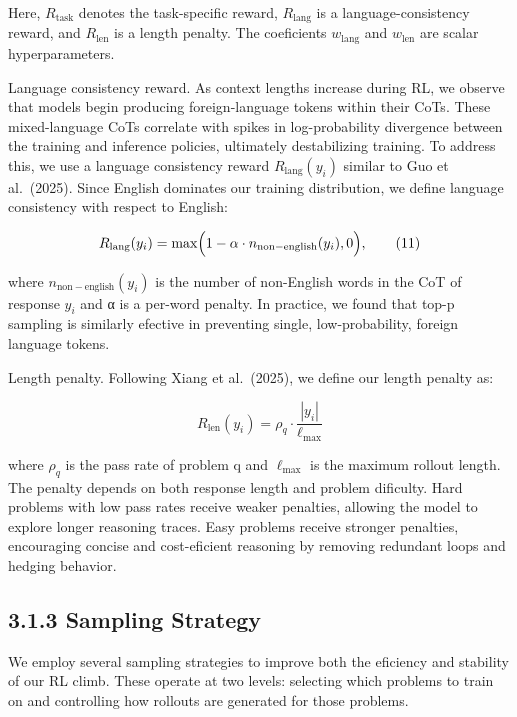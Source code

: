 \documentclass[
  10
]{article}
\begin{document}
Here, \(R _ { \mathrm { t a s k } }\) denotes the task-specific reward,
\(R _ { \mathrm { l a n g } }\) is a language-consistency reward, and
\(R _ { \mathrm { l e n } }\) is a length penalty. The coeficients
\(w _ { \mathrm { l a n g } }\) and \(w _ { \mathrm { l e n } }\) are
scalar hyperparameters.

Language consistency reward. As context lengths increase during RL, we
observe that models begin producing foreign-language tokens within their
CoTs. These mixed-language CoTs correlate with spikes in log-probability
divergence between the training and inference policies, ultimately
destabilizing training. To address this, we use a language consistency
reward \(R _ { \mathrm { l a n g } } ( y _ { i } )\) similar to Guo et
al.~(2025). Since English dominates our training distribution, we define
language consistency with respect to English:

\[
R _ { \mathrm { l a n g } } ( y _ { i } ) = \operatorname* { m a x } \Bigl ( 1 - \alpha \cdot n _ { \mathrm { n o n - e n g l i s h } } ( y _ { i } ) , 0 \Bigr ) ,\tag{11}
\]

where \(n _ { \mathrm { n o n - e n g l i s h } } ( y _ { i } )\) is the
number of non-English words in the CoT of response \(y _ { i }\) and α
is a per-word penalty. In practice, we found that top-p sampling is
similarly efective in preventing single, low-probability, foreign
language tokens.

Length penalty. Following Xiang et al.~(2025), we define our length
penalty as:

\[
R _ { \mathrm { l e n } } ( y _ { i } ) = \rho _ { q } \cdot \frac { | y _ { i } | } { \ell _ { \mathrm { m a x } } }\tag{12}
\]

where \(\rho _ { q }\) is the pass rate of problem q and
\(\ell _ { \mathrm { m a x } }\) is the maximum rollout length. The
penalty depends on both response length and problem dificulty. Hard
problems with low pass rates receive weaker penalties, allowing the
model to explore longer reasoning traces. Easy problems receive stronger
penalties, encouraging concise and cost-eficient reasoning by removing
redundant loops and hedging behavior.

\subsection{3.1.3 Sampling Strategy}\label{sampling-strategy}

We employ several sampling strategies to improve both the eficiency and
stability of our RL climb. These operate at two levels: selecting which
problems to train on and controlling how rollouts are generated for
those problems.
\end{document}
